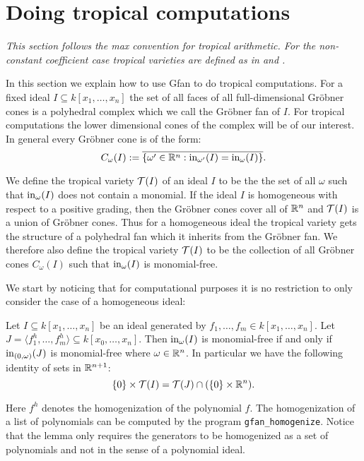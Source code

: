 \newpage
\section{Doing tropical computations}
\label{sec:tropical}
\emph{This section follows the max convention for tropical
arithmetic. For the non-constant coefficient case tropical varieties are defined as in \cite{lifting} and \cite{thesis}.}
\vspace{0.5cm}

In this section we
explain how to use Gfan to do tropical computations.  For a fixed ideal $I\subseteq
k[x_1,\dots,x_n]$ the set of all faces of all full-dimensional
Gr\"obner cones is a polyhedral complex which we call the Gr\"obner
fan of $I$. For tropical computations the lower dimensional cones of
the complex will be of our interest. In general every Gr\"obner cone
is of the form:
$$C_\omega(I):=\overline{\{\omega'\in\mathbb{R}^n:\textup{in}_{\omega'}(I)=\textup{in}_\omega(I)\}
}.$$ 

We define the tropical variety $ \mathcal{T} (I)$ of an ideal $I$ to be the
the set of all $\omega$ such that $\textup{in}_\omega(I)$ does not contain a monomial.
If the ideal $I$ is homogeneous with respect to a positive grading, then the Gr\"obner cones cover all of $\mathbb{R}^n$ and $ \mathcal{T} (I)$ is a union of Gr\"obner cones.
Thus for a homogeneous ideal the tropical variety gets the structure of a polyhedral fan which it inherits from the Gr\"obner fan.
We therefore also define the tropical variety $ \mathcal{T} (I)$ to be the collection of all Gr\"obner cones $C_\omega(I)$ such that $\textup{in}_\omega(I)$ is monomial-free.

We start by noticing that for computational purposes it is no restriction to only consider the case of a homogeneous ideal:
\begin{lemma}\cite[Lemma~6.2.5]{thesis}
\label{lem:tropical by homogenisation}
Let $I\subseteq k[x_1,\dots,x_n]$ be an ideal generated by
$f_1,\dots,f_m\in k[x_1,\dots,x_n]$. Let $J=\langle
f_1^h,\dots,f_m^h\rangle\subseteq k[x_0,\dots,x_n]$. Then $\textup{in}_\omega(I)$ is monomial-free if and
only if $\textup{in}_{(0,\omega)}(J)$ is monomial-free where $\omega\in\mathbb{R}^n$. In particular we have the following identity of sets in $\mathbb{R}^{n+1}$:
$$\{0\}\times \mathcal{T} (I)= \mathcal{T} (J)\cap(\{0\}\times\mathbb{R}^n).$$
\end{lemma}
Here $f^h$ denotes the homogenization of the polynomial $f$.
The homogenization of a list of polynomials can be computed by the program \texttt{gfan\_homogenize}.
Notice that the lemma only requires the generators to be homogenized as a set of polynomials and not in the sense of a polynomial ideal.

